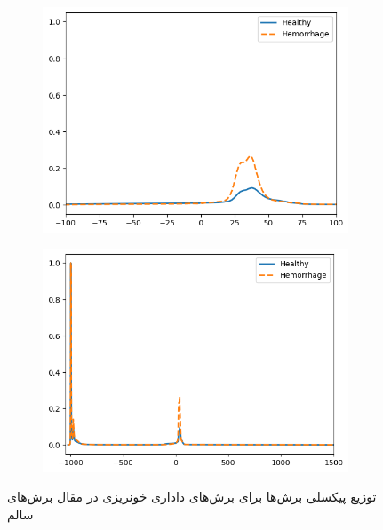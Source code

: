  \begin{figure}[ht]
		\centering %
		\begin{subfigure}{0.45\textwidth}
			\includegraphics[width=\linewidth]{Images/Chapter2/Pixel histogram.png}
			\caption{}
			\label{fig: ch2-slice hist whole}
		\end{subfigure}\hfil %
		\begin{subfigure}{0.45\textwidth}
			\includegraphics[width=\linewidth,]{Images/Chapter2/Pixel histogram lim.png}
			\caption{}
			\label{fig: ch2-slice hist lim}
		\end{subfigure}
		\caption{توزیع پیکسلی برش‌ها برای برش‌های داداری خونریزی در مقال برش‌های سالم}
		\label{fig: ch2-slice hist}
\end{figure} 


